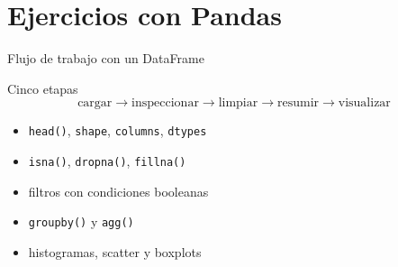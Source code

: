 \documentclass[10pt]{beamer}
\begin{document}

\section{Ejercicios con Pandas}

\begin{frame}{Flujo de trabajo con un DataFrame}
  \begin{block}{Cinco etapas}
    \[
      \text{cargar}
      \longrightarrow
      \text{inspeccionar}
      \longrightarrow
      \text{limpiar}
      \longrightarrow
      \text{resumir}
      \longrightarrow
      \text{visualizar}
    \]
  \end{block}

  \begin{itemize}
    \item \texttt{head()}, \texttt{shape}, \texttt{columns}, \texttt{dtypes}
    \item \texttt{isna()}, \texttt{dropna()}, \texttt{fillna()}
    \item filtros con condiciones booleanas
    \item \texttt{groupby()} y \texttt{agg()}
    \item histogramas, scatter y boxplots
  \end{itemize}
\end{frame}
\end{document}
